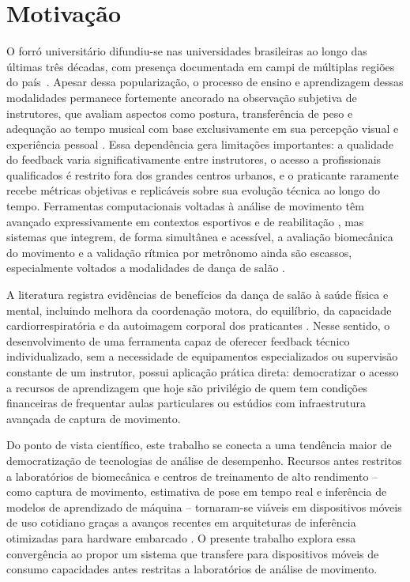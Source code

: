 \newpage
\section{Motivação}
\label{sec:motivacao}

O forró universitário difundiu-se nas universidades brasileiras ao longo das últimas três décadas, com presença documentada em campi de múltiplas regiões do país~\cite{havt2026dancar}. Apesar dessa popularização, o processo de ensino e aprendizagem dessas modalidades permanece fortemente ancorado na observação subjetiva de instrutores, que avaliam aspectos como postura, transferência de peso e adequação ao tempo musical com base exclusivamente em sua percepção visual e experiência pessoal \cite{porto2023ressignificando}. Essa dependência gera limitações importantes: a qualidade do feedback varia significativamente entre instrutores, o acesso a profissionais qualificados é restrito fora dos grandes centros urbanos, e o praticante raramente recebe métricas objetivas e replicáveis sobre sua evolução técnica ao longo do tempo. Ferramentas computacionais voltadas à análise de movimento têm avançado expressivamente em contextos esportivos e de reabilitação \cite{latyshev2024computer}, mas sistemas que integrem, de forma simultânea e acessível, a avaliação biomecânica do movimento e a validação rítmica por metrônomo ainda são escassos, especialmente voltados a modalidades de dança de salão \cite{THARATIPYAKUL2024e36589}.

A literatura registra evidências de benefícios da dança de salão à saúde física e mental, incluindo melhora da coordenação motora, do equilíbrio, da capacidade cardiorrespiratória e da autoimagem corporal dos praticantes \cite{fonseca2012, rodrigues2011, paiva2019danca}. Nesse sentido, o desenvolvimento de uma ferramenta capaz de oferecer feedback técnico individualizado, sem a necessidade de equipamentos especializados ou supervisão constante de um instrutor, possui aplicação prática direta: democratizar o acesso a recursos de aprendizagem que hoje são privilégio de quem tem condições financeiras de frequentar aulas particulares ou estúdios com infraestrutura avançada de captura de movimento.

Do ponto de vista científico, este trabalho se conecta a uma tendência maior de democratização de tecnologias de análise de desempenho. Recursos antes restritos a laboratórios de biomecânica e centros de treinamento de alto rendimento -- como captura de movimento, estimativa de pose em tempo real e inferência de modelos de aprendizado de máquina -- tornaram-se viáveis em dispositivos móveis de uso cotidiano graças a avanços recentes em arquiteturas de inferência otimizadas para hardware embarcado \cite{lee2019ondevice, li2020edgeai}. O presente trabalho explora essa convergência ao propor um sistema que transfere para dispositivos móveis de consumo capacidades antes restritas a laboratórios de análise de movimento.


